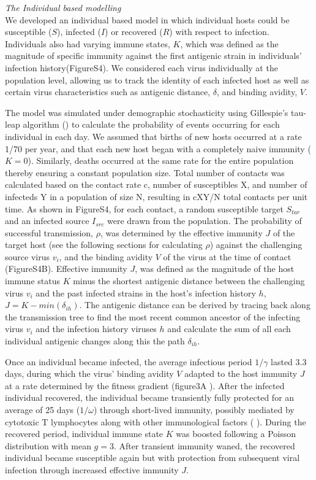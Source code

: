 \documentclass[12pt,a4paper]{article}
\begin{document}
\textit{The Individual based modelling} \\
We developed an individual based model in which individual hosts could be susceptible ($S$), infected ($I$) or recovered ($R$) with respect to infection. Individuals also had varying immune states, $K$, which was defined as the magnitude of specific immunity against the first antigenic strain in individuals’ infection history(FigureS4). We considered each virus individually at the population level, allowing us to track the identity of each infected host as well as certain virus characteristics such as antigenic distance, $\delta$, and binding avidity, $V$.

The model was simulated under demographic stochasticity using Gillespie’s tau-leap algorithm (\cite{Gillespie2001}) to calculate the probability of events occurring for each individual in each day. We assumed that births of new hosts occurred at a rate 1/70 per year, and that each new host began with a completely naive immunity ($K = 0$). Similarly, deaths occurred at the same rate for the entire population thereby ensuring a constant population size. Total number of contacts was calculated based on the contact rate c, number of susceptibles X, and number of infecteds Y in a population of size N, resulting in cXY/N total contacts per unit time. As shown in FigureS4, for each contact, a random susceptible target $S_{tar}$ and an infected source $I_{src}$ were drawn from the population. The probability of successful transmission, $\rho$, was determined by the effective immunity $J$ of the target host (see the following sections for calculating $\rho$) against the challenging source virus $v_{i}$, and the binding avidity $V$ of the virus at the time of contact (FigureS4B). Effective immunity $J$, was defined as the magnitude of the host immune status $K$ minus the shortest antigenic distance between the challenging virus $v_{i}$ and the past infected strains in the host’s infection history $h$, $J =K - min(\delta_{ih})$. The antigenic distance can be derived by tracing back along the transmission tree to find the most recent common ancestor of the infecting virus $v_{i}$ and the infection history viruses $h$ and calculate the sum of all each individual antigenic changes along this the path $\delta_{ih}$.

Once an individual became infected, the average infectious period $1/\gamma$ lasted 3.3 days, during which the virus’ binding avidity $V$ adapted to the host immunity $J$ at a rate determined by the fitness gradient (figure3A \cite{Yuan2013}). After the infected individual recovered, the individual became transiently fully protected for an average of 25 days ($1/\omega$) through short-lived immunity, possibly mediated by cytotoxic T lymphocytes along with other immunological factors (\cite{Ferguson2003} \cite{Kaech2012}). During the recovered period, individual immune state $K$ was boosted following a Poisson distribution with mean $g=3$. After transient immunity waned, the recovered individual became susceptible again but with protection from subsequent viral infection through increased effective immunity $J$.
\end{document}

